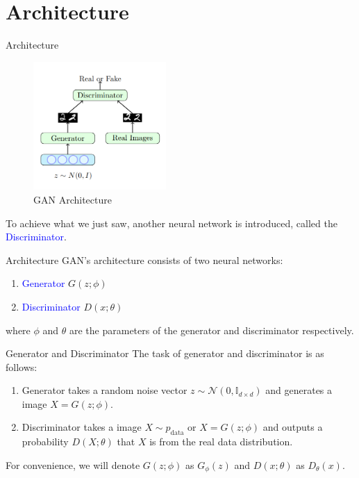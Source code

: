 \section*{Architecture}
\begin{frame}{Architecture}
    \begin{figure}
        \centering
        \includegraphics[width=0.45\textwidth]{../Images/gan2.png}
        \caption{GAN Architecture}
    \end{figure}
    To achieve what we just saw, another neural network is introduced, called the \textcolor{blue}{Discriminator}.
\end{frame}

\begin{frame}{Architecture}
    GAN's architecture consists of two neural networks:
    \begin{enumerate}
        \item \textcolor{blue}{Generator} $G(z;\phi)$
        \item \textcolor{blue}{Discriminator} $D(x;\theta)$
    \end{enumerate}

    where $\phi$ and $\theta$ are the parameters of the generator and discriminator respectively.
\end{frame}

\begin{frame}{Generator and Discriminator}
    The task of generator and discriminator is as follows:
    \begin{enumerate}
        \item Generator takes a random noise vector $z \sim \mathcal{N}(0,\mathbb{I}_{d \times d})$ and generates a image $X = G(z;\phi)$.

        \item Discriminator takes a image $X \sim p_{\text{data}}$ or $X = G(z;\phi)$ and outputs a probability $D(X;\theta)$ that $X$ is from the real data distribution.
    \end{enumerate}

    For convenience, we will denote $G(z;\phi)$ as $G_{\phi}(z)$ and $D(x;\theta)$ as $D_{\theta}(x)$.
\end{frame}

